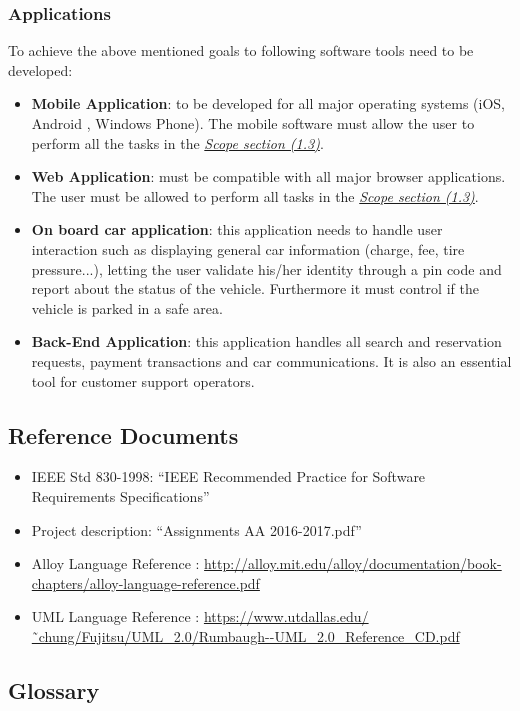 \documentclass[12pt]{article}
\begin{document}
	\subsubsection{Applications}
	To achieve the above mentioned goals to following software tools need to be developed:
	
	\begin{itemize}
	\item \textbf{Mobile Application}: to be developed for all major operating systems (iOS, Android , Windows Phone). The mobile software must allow the user to perform all the tasks in the \hyperref[scope:1]{\textit{Scope section (1.3)}}.
	\item \textbf{Web Application}: must be compatible with all major browser applications. The user must be allowed to perform all tasks in  the \hyperref[scope:1]{\textit{Scope section (1.3)}}.
	\item \textbf{ On board car application}: this application needs to handle user interaction such as displaying general car information (charge, fee, tire pressure...), letting the user validate his/her identity through a pin code and report about the status of the vehicle. 
Furthermore it must control if the vehicle is parked in a safe area.
	\item \textbf{ Back-End Application}: this application handles all search and reservation requests, payment transactions and car communications. It is also an essential tool for customer support operators.
	
	\end{itemize}
		
	
	\subsection{Reference Documents}
	 \begin{itemize}
	 	\item IEEE Std 830-1998: “IEEE Recommended Practice for Software Requirements Specifications”
	 	\item Project description: “Assignments AA 2016-2017.pdf”
	 	\item Alloy Language Reference : \url{http://alloy.mit.edu/alloy/documentation/book-chapters/alloy-language-reference.pdf}
	 	\item UML Language Reference : \url{https://www.utdallas.edu/˜chung/Fujitsu/UML_2.0/Rumbaugh--UML_2.0_Reference_CD.pdf}
	 \end{itemize}
	 
	 
	\subsection{\label{actors:3}Glossary}
	
\end{document}
